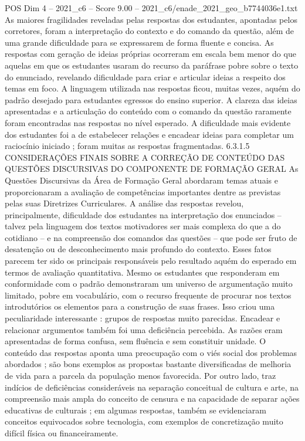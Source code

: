 \begin{textsample}{POS Dim 4 – 2021\_c6 – Score 9.00 – 2021\_c6/enade\_2021\_geo\_b7744036e1.txt}
As maiores fragilidades reveladas pelas respostas dos estudantes, apontadas pelos corretores, foram a interpretação do contexto e do comando da questão, além de uma grande dificuldade para se expressarem de forma fluente e concisa.
As respostas com geração de ideias próprias ocorreram em escala bem menor do que aquelas em que os estudantes usaram do recurso da paráfrase pobre sobre o texto do enunciado, revelando dificuldade para criar e articular ideias a respeito dos temas em foco.
A linguagem utilizada nas respostas ficou, muitas vezes, aquém do padrão desejado para estudantes egressos do ensino superior.
A clareza das ideias apresentadas e a articulação do conteúdo com o comando da questão raramente foram encontradas nas respostas no nível esperado.
A dificuldade mais evidente dos estudantes foi a de estabelecer relações e encadear ideias para completar um raciocínio iniciado ; foram muitas as respostas fragmentadas. 6.3.1.5 CONSIDERAÇÕES FINAIS SOBRE A CORREÇÃO DE CONTEÚDO DAS QUESTÕES DISCURSIVAS DO COMPONENTE DE FORMAÇÃO GERAL As Questões Discursivas da Área de Formação Geral abordaram temas atuais e proporcionaram a avaliação de competências importantes dentre as previstas pelas suas Diretrizes Curriculares.
A análise das respostas revelou, principalmente, dificuldade dos estudantes na interpretação dos enunciados – talvez pela linguagem dos textos motivadores ser mais complexa do que a do cotidiano – e na compreensão dos comandos das questões – que pode ser fruto de desatenção ou de desconhecimento mais profundo do contexto.
Esses fatos parecem ter sido os principais responsáveis pelo resultado aquém do esperado em termos de avaliação quantitativa.
Mesmo os estudantes que responderam em conformidade com o padrão demonstraram um universo de argumentação muito limitado, pobre em vocabulário, com o recurso frequente de procurar nos textos introdutórios os elementos para a construção de suas frases.
Isso criou uma peculiaridade interessante : grupos de respostas muito parecidas.
Encadear e relacionar argumentos também foi uma deficiência percebida.
As razões eram apresentadas de forma confusa, sem fluência e sem constituir unidade.
O conteúdo das respostas aponta uma preocupação com o viés social dos problemas abordados ; são bons exemplos as propostas bastante diversificadas de melhoria de vida para a parcela da população menos favorecida.
Por outro lado, traz indícios de deficiências consideráveis na separação conceitual de cultura e arte, na compreensão mais ampla do conceito de censura e na capacidade de separar ações educativas de culturais ; em algumas respostas, também se evidenciaram conceitos equivocados sobre tecnologia, com exemplos de concretização muito difícil física ou financeiramente.

\end{textsample}
